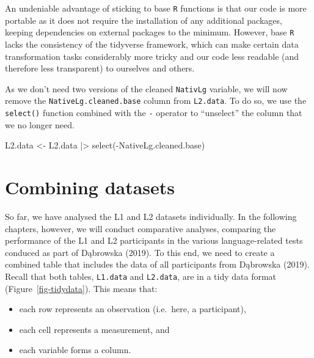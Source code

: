 \documentclass[
  letterpaper,
  DIV=11,
  numbers=noendperiod]{scrreprt}
\newenvironment{Shaded}{\begin{snugshade}}{\end{snugshade}}
\newcommand{\FunctionTok}[1]{\textcolor[rgb]{0.28,0.35,0.67}{#1}}
\newcommand{\NormalTok}[1]{\textcolor[rgb]{0.00,0.23,0.31}{#1}}
\newcommand{\OtherTok}[1]{\textcolor[rgb]{0.00,0.23,0.31}{#1}}
\newcommand{\SpecialCharTok}[1]{\textcolor[rgb]{0.37,0.37,0.37}{#1}}
\providecommand{\tightlist}{%
  \setlength{\itemsep}{0pt}\setlength{\parskip}{0pt}}
\begin{document}
\begin{tcolorbox}
An undeniable advantage of sticking to base \texttt{R} functions is that
our code is more portable as it does not require the installation of any
additional packages, keeping dependencies on external packages to the
minimum. However, base \texttt{R} lacks the consistency of the tidyverse
framework, which can make certain data transformation tasks considerably
more tricky and our code less readable (and therefore less transparent)
to ourselves and others.

As we don't need two versions of the cleaned \texttt{NativLg} variable,
we will now remove the \texttt{NativeLg.cleaned.base} column from
\texttt{L2.data}. To do so, we use the \texttt{select()} function
combined with the \texttt{-} operator to ``unselect'' the column that we
no longer need.

\begin{Shaded}
\begin{Highlighting}[]
\NormalTok{L2.data }\OtherTok{\textless{}{-}}\NormalTok{ L2.data }\SpecialCharTok{|\textgreater{}} 
  \FunctionTok{select}\NormalTok{(}\SpecialCharTok{{-}}\NormalTok{NativeLg.cleaned.base)}
\end{Highlighting}
\end{Shaded}

\end{tcolorbox}

\section{Combining datasets}\label{sec-CombiningDatasets}

So far, we have analysed the L1 and L2 datasets individually. In the
following chapters, however, we will conduct comparative analyses,
comparing the performance of the L1 and L2 participants in the various
language-related tests conduced as part of Dąbrowska (2019). To this
end, we need to create a combined table that includes the data of all
participants from Dąbrowska (2019). Recall that both tables,
\texttt{L1.data} and \texttt{L2.data}, are in a tidy data format
(Figure~\ref{fig-tidydata}). This means that:

\begin{itemize}
\tightlist
\item
  each row represents an observation (i.e.~here, a participant),
\item
  each cell represents a measurement, and
\item
  each variable forms a column.
\end{itemize}
\end{document}
